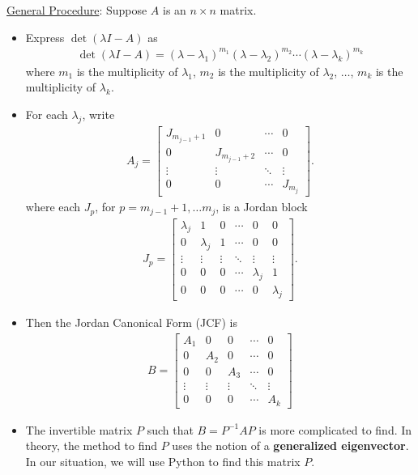 \documentclass[12pt,a4paper]{article}
\begin{document}
	\underline{General Procedure}: Suppose $A$ is an $n \times n$ matrix.
	\begin{itemize}
	\item Express $\det (\lambda I - A )$ as
		\begin{align*}
		\det (\lambda I - A) = (\lambda - \lambda_1)^{m_1} (\lambda - \lambda_2 )^{m_2} \cdots (\lambda - \lambda_k)^{m_k}
		\end{align*}
	where $m_1$ is the multiplicity of $\lambda_1$, $m_2$ is the multiplicity of $\lambda_2$, $\ldots$, $m_k$ is the multiplicity of $\lambda_k$.
	\item For each $\lambda_j$, write
		\begin{align*}
		A_{j} = \begin{bmatrix}
		J_{m_{j-1} + 1} & 0 & \cdots & 0 \\
		0 & J_{m_{j - 1} + 2} & \cdots & 0 \\
		\vdots & \vdots & \ddots & \vdots \\
		0 & 0 & \cdots & J_{m_j}
		\end{bmatrix} .
		\end{align*}
	where each $J_p$, for $p = m_{j-1} + 1, \ldots m_j$, is a Jordan block
		\begin{align*}
		J_p = \begin{bmatrix}
		\lambda_j & 1 & 0 & \cdots & 0 & 0 \\
		0 & \lambda_j & 1 & \cdots & 0 & 0 \\
		\vdots & \vdots & \vdots & \ddots & \vdots & \vdots \\
		0 & 0 & 0 & \cdots & \lambda_j & 1 \\
		0 & 0 & 0 & \cdots & 0 & \lambda_j
		\end{bmatrix} .
		\end{align*}
	\item Then the Jordan Canonical Form (JCF) is
		\begin{align*}
		B = \begin{bmatrix}
		A_1 & 0 & 0 & \cdots & 0 \\
		0 & A_2 & 0 & \cdots & 0 \\
		0 & 0 & A_3 & \cdots & 0 \\
		\vdots & \vdots & \vdots & \ddots  & \vdots \\
		0 & 0 & 0 & \cdots & A_k
		\end{bmatrix}
		\end{align*}
	\item The invertible matrix $P$ such that $B = P^{-1} A P$ is more complicated to find. In theory, the method to find $P$ uses the notion of a \textbf{generalized eigenvector}. In our situation, we will use Python to find this matrix $P$. 
	\end{itemize}
	
\end{document}
